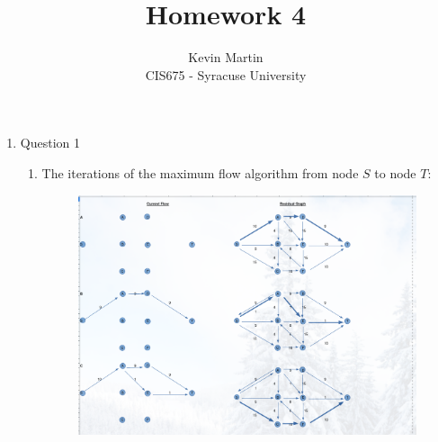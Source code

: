 \documentclass{article}
\author{Kevin Martin\\ CIS675 - Syracuse University}
\title{Homework 4}
\begin{document}
\maketitle
\begin{enumerate}
  \item Question 1
    \begin{enumerate}
      \item The iterations of the maximum flow algorithm from node $S$ to node $T$:\\
        \begin{figure}[h]
              \centering
            \includegraphics[scale=.36]{mincut1.png}
            \end{figure}


\end{enumerate}
\end{enumerate}
\end{document}
